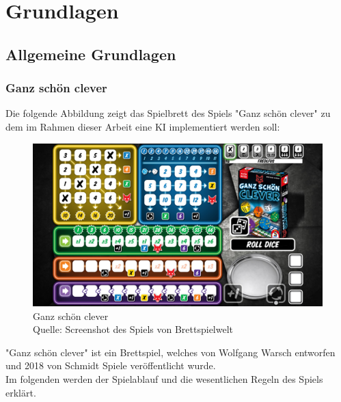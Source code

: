 \section{Grundlagen}
\subsection{Allgemeine Grundlagen}
\subsubsection{Ganz schön clever}
	Die folgende Abbildung zeigt das Spielbrett des Spiels "Ganz schön clever" zu dem im Rahmen dieser Arbeit eine KI implementiert werden soll:
	\nopagebreak
\begin{figure}[h]
	\includegraphics[width=1\textwidth]{Bilder/gsc} 
	\caption[Ganz schön clever]{Ganz schön clever\\ Quelle: Screenshot des Spiels von Brettspielwelt}
\end{figure}

"Ganz schön clever" ist ein Brettspiel, welches von Wolfgang Warsch entworfen und 2018 von Schmidt Spiele veröffentlicht wurde.\\

Im folgenden werden der Spielablauf und die wesentlichen Regeln des Spiels erklärt.

